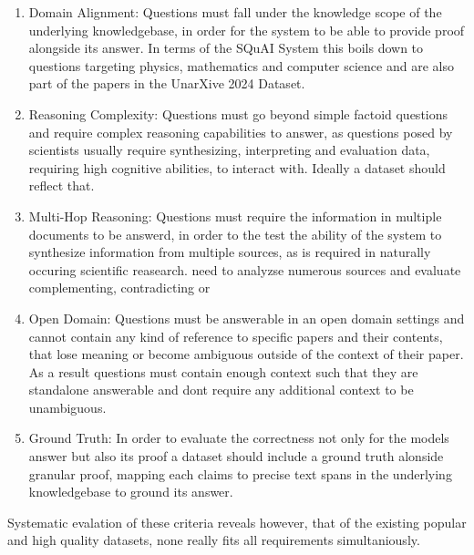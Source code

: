 \begin{enumerate}
    \item Domain Alignment: Questions must fall under the knowledge scope of the underlying knowledgebase, in order for the system to be able to provide proof alongside its answer. In terms of the SQuAI System this boils down to questions targeting physics, mathematics and computer science and are also part of the papers in the UnarXive 2024 Dataset.
    \item Reasoning Complexity: Questions must go beyond simple factoid questions and require complex reasoning capabilities to answer, as questions posed by scientists usually require synthesizing, interpreting and evaluation data, requiring high cognitive abilities, to interact with. Ideally a dataset should reflect that. 
    \item Multi-Hop Reasoning: Questions must require the information in multiple documents to be answerd, in order to the test the ability of the system to synthesize information from multiple sources, as is required in naturally occuring scientific reasearch.
    need to analyzse numerous sources and evaluate complementing, contradicting or 
    \item Open Domain: Questions must be answerable in an open domain settings and cannot contain any kind of reference to specific papers and their contents, that lose meaning or become ambiguous outside of the context of their paper. As a result questions must contain enough context such that they are standalone answerable and dont require any additional context to be unambiguous.
    \item Ground Truth: In order to evaluate the correctness not only for the models answer but also its proof a dataset should include a ground truth alonside granular proof, mapping each claims to precise text spans in the underlying knowledgebase to ground its answer.
\end{enumerate}

Systematic evalation of these criteria reveals however, that of the existing popular and high quality datasets, none really fits all requirements simultaniously.







